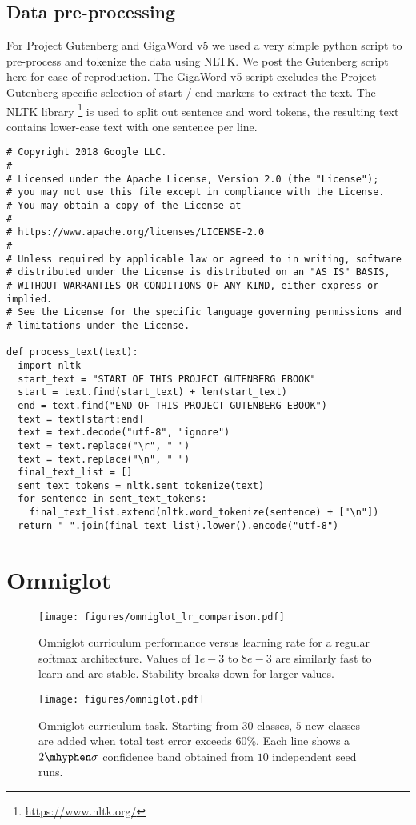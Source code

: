 \documentclass{article} \usepackage{hyperref}
\def\r{\mathbf{r}}
\begin{document}
\newpage

\subsection{Data pre-processing}
\label{appendix:preprocess}
For Project Gutenberg and GigaWord v5 we used a very simple python script to pre-process and tokenize the data using NLTK. We post the Gutenberg script here for ease of reproduction. The GigaWord v5 script excludes the Project Gutenberg-specific selection of start / end markers to extract the text. The NLTK library \footnote{\url{https://www.nltk.org/}} is used to split out sentence and word tokens, the resulting text contains lower-case text with one sentence per line.
\begin{small}
\begin{verbatim}
# Copyright 2018 Google LLC.
#
# Licensed under the Apache License, Version 2.0 (the "License");
# you may not use this file except in compliance with the License.
# You may obtain a copy of the License at
#
# https://www.apache.org/licenses/LICENSE-2.0
#
# Unless required by applicable law or agreed to in writing, software
# distributed under the License is distributed on an "AS IS" BASIS,
# WITHOUT WARRANTIES OR CONDITIONS OF ANY KIND, either express or implied.
# See the License for the specific language governing permissions and
# limitations under the License.

def process_text(text):
  import nltk
  start_text = "START OF THIS PROJECT GUTENBERG EBOOK"
  start = text.find(start_text) + len(start_text)
  end = text.find("END OF THIS PROJECT GUTENBERG EBOOK")
  text = text[start:end]
  text = text.decode("utf-8", "ignore")
  text = text.replace("\r", " ")
  text = text.replace("\n", " ")
  final_text_list = []
  sent_text_tokens = nltk.sent_tokenize(text)
  for sentence in sent_text_tokens:
    final_text_list.extend(nltk.word_tokenize(sentence) + ["\n"])
  return " ".join(final_text_list).lower().encode("utf-8")
\end{verbatim}
\end{small}

\newpage

\section{Omniglot}
\label{appendix:omniglot}
\begin{figure}[h!]
    \centering
    \texttt{[image: figures/omniglot\_lr\_comparison.pdf]}
    \caption{Omniglot curriculum performance versus learning rate for a regular softmax architecture. Values of $1e-3$ to $8e-3$ are similarly fast to learn and are stable. Stability breaks down for larger values.}
    \label{fig:omniglot_lr}
\end{figure}

\begin{figure}[h!]
    \centering
    \texttt{[image: figures/omniglot.pdf]}
    \caption{Omniglot curriculum task. Starting from $30$ classes, $5$ new classes are added when total test error exceeds $60$\%. Each line shows a $2\mhyphen\sigma$ confidence band obtained from $10$ independent seed runs.}
    \label{fig:omniglot}
\end{figure}
\end{document}
